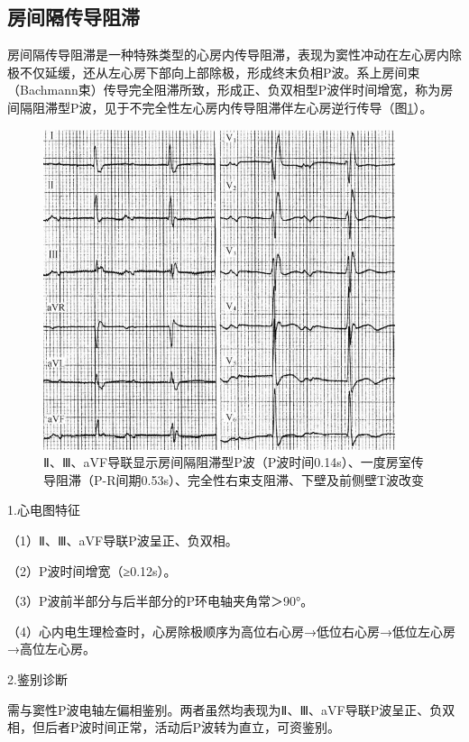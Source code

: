 \protect\hypertarget{text00026.htmlux5cux23subid317}{}{}

\subsection{房间隔传导阻滞}

房间隔传导阻滞是一种特殊类型的心房内传导阻滞，表现为窦性冲动在左心房内除极不仅延缓，还从左心房下部向上部除极，形成终末负相P波。系上房间束（Bachmann束）传导完全阻滞所致，形成正、负双相型P波伴时间增宽，称为房间隔阻滞型P波，见于不完全性左心房内传导阻滞伴左心房逆行传导（图\ref{fig19-7}）。

\begin{figure}[!htbp]
 \centering
 \includegraphics[width=4.0625in,height=3.69792in]{./images/Image00323.jpg}
 \captionsetup{justification=centering}
 \caption{Ⅱ、Ⅲ、aVF导联显示房间隔阻滞型P波（P波时间0.14s）、一度房室传导阻滞（P-R间期0.53s）、完全性右束支阻滞、下壁及前侧壁T波改变}
 \label{fig19-7}
  \end{figure} 

1.心电图特征

（1）Ⅱ、Ⅲ、aVF导联P波呈正、负双相。

（2）P波时间增宽（≥0.12s）。

（3）P波前半部分与后半部分的P环电轴夹角常＞90°。

（4）心内电生理检查时，心房除极顺序为高位右心房→低位右心房→低位左心房→高位左心房。

2.鉴别诊断

需与窦性P波电轴左偏相鉴别。两者虽然均表现为Ⅱ、Ⅲ、aVF导联P波呈正、负双相，但后者P波时间正常，活动后P波转为直立，可资鉴别。

